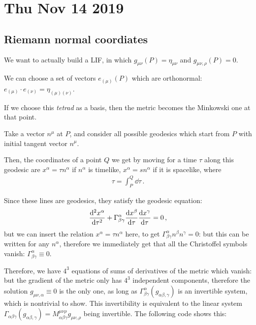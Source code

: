 \documentclass[main.tex]{subfiles}
\begin{document}
\section*{Thu Nov 14 2019}

\subsection{Riemann normal coordiates}

We want to actually build a LIF, in which \(g_{\mu \nu } (P ) = \eta_{\mu \nu }\) and \(g_{\mu \nu , \rho } (P)= 0\).

We can choose a set of vectors \(e_{(\mu )} (P)\) which are orthonormal: \(e_{(\mu )} \cdot e_{(\nu )} = \eta_{(\mu )(\nu )}\). 

If we choose this \emph{tetrad} as a basis, then the metric becomes the Minkowski one at that point.

Take a vector \(n^{\mu }\) at \(P\), and consider all possible geodesics which start from \(P\) with initial tangent vector \(n^{\mu }\).

Then, the coordinates of a point \(Q\) we get by moving for a time \(\tau \) along this geodesic are \(x^{\alpha } = \tau n^{\alpha }\) if \(n^{\alpha }\) is timelike, \(x^{\alpha } = s n^{\alpha }\) if it is spacelike, where 
%
\begin{align}
  \tau = \int _{P}^{Q} \dd{\tau } 
\,.
\end{align}

Since these lines are geodesics, they satisfy the geodesic equation: 
%
\begin{align}
  \dv[2]{x^{\alpha }}{\tau } + \Gamma^{\alpha }_{\beta \gamma } \dv{x^{\beta }}{\tau } \dv{x^{\gamma }}{\tau } = 0
\,,
\end{align}
%
but we can insert the relation \(x^{\alpha } = \tau n^{\alpha }\) here, to get \(\Gamma^{\alpha }_{\beta \gamma } n^{\beta } n^{\gamma }=0\): but this can be written for any \(n^{\alpha }\), therefore we immediately get that all the Christoffel symbols vanish: \(\Gamma^{ \alpha }_{\beta \gamma } \equiv 0\). 

Therefore, we have \(4^{3}\) equations of sums of derivatives of the metric which vanish: but the gradient of the metric only has \(4^{3}\) independent components, therefore the solution \(g_{\mu \nu , \alpha } \equiv 0\) is the only one, as long as \(\Gamma^{\alpha }_{\beta \gamma } (g_{\alpha \beta , \gamma })\) is an invertible system, which is nontrivial to show.
This invertibility is equivalent to the linear system \(\Gamma_{\alpha \beta \gamma } (g_{\alpha \beta , \gamma }) = M^{\mu \nu \rho }_{\alpha \beta \gamma } g_{\mu \nu , \rho }\) being invertible. 
The following code shows this: 
\end{document}
